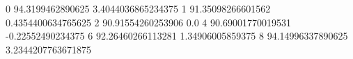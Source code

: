 0 94.3199462890625 3.4044036865234375
1 91.35098266601562 0.4354400634765625
2 90.91554260253906 0.0
4 90.69001770019531 -0.22552490234375
6 92.26460266113281 1.34906005859375
8 94.14996337890625 3.2344207763671875
